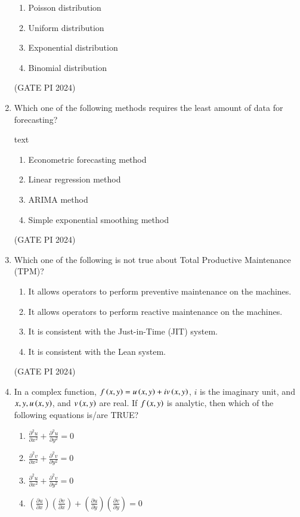 \documentclass[journal,12pt,onecolumn]{IEEEtran}
\theoremstyle{remark}
\begin{document}
\begin{enumerate}
\begin{multicols}{2}
\begin{enumerate}
    \item Poisson distribution
    \item Uniform distribution
    \item Exponential distribution
    \item Binomial distribution
\end{enumerate}
\end{multicols}

\hfill (GATE PI 2024)

\item Which one of the following methods requires the least amount of data for forecasting?

text
\begin{enumerate}
    \item Econometric forecasting method
    \item Linear regression method
    \item ARIMA method
    \item Simple exponential smoothing method
\end{enumerate}

\hfill (GATE PI 2024)

\item Which one of the following is not true about Total Productive Maintenance (TPM)?

\begin{enumerate}
    \item It allows operators to perform preventive maintenance on the machines.
    \item It allows operators to perform reactive maintenance on the machines.
    \item It is consistent with the Just-in-Time (JIT) system.
    \item It is consistent with the Lean system.
\end{enumerate}

\hfill (GATE PI 2024)

\item In a complex function, $f\left(x,y\right) = u\left(x,y\right) + i v\left(x,y\right)$, $i$ is the imaginary unit, and $x, y, u\left(x,y\right)$, and $v\left(x,y\right)$ are real. If $f\left(x,y\right)$ is analytic, then which of the following equations is/are TRUE?
\begin{enumerate}
\setlength{\itemsep}{1em}
\item $\frac{\partial^2 u}{\partial x^2} + \frac{\partial^2 u}{\partial y^2} = 0$
\item $\frac{\partial^2 v}{\partial x^2} + \frac{\partial^2 v}{\partial y^2} = 0$
\item $\frac{\partial^2 u}{\partial x^2} + \frac{\partial^2 v}{\partial y^2} = 0$
\item $\left( \frac{\partial u}{\partial x} \right) \left( \frac{\partial v}{\partial x} \right) + \left( \frac{\partial u}{\partial y} \right) \left( \frac{\partial v}{\partial y} \right) = 0$
\end{enumerate}


\end{enumerate}
\end{document}
